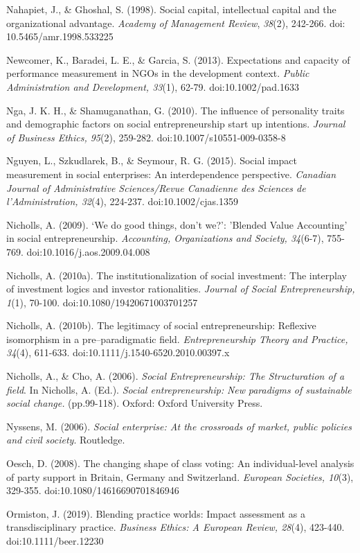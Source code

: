 \documentclass{article}
\begin{document}
Nahapiet, J., \& Ghoshal, S. (1998). Social capital, intellectual capital and the organizational advantage. \emph{Academy of Management Review}, \emph{38}(2), 242-266. doi: 10.5465/amr.1998.533225

Newcomer, K., Baradei, L. E., \& Garcia, S. (2013). Expectations and capacity of performance measurement in NGOs in the development context. \emph{Public Administration and Development, 33}(1), 62-79. doi:10.1002/pad.1633

Nga, J. K. H., \& Shamuganathan, G. (2010). The influence of personality traits and demographic factors on social entrepreneurship start up intentions. \emph{Journal of Business Ethics, 95}(2), 259-282. doi:10.1007/s10551-009-0358-8

Nguyen, L., Szkudlarek, B., \& Seymour, R. G. (2015). Social impact measurement in social enterprises: An interdependence perspective. \emph{Canadian Journal of Administrative Sciences/Revue Canadienne des Sciences de }\emph{l'Administration}\emph{, 32}(4), 224-237. doi:10.1002/cjas.1359

Nicholls, A. (2009). ‘We do good things, don't we?': 'Blended Value Accounting' in social entrepreneurship. \emph{Accounting, Organizations and Society, 34}(6-7), 755-769. doi:10.1016/j.aos.2009.04.008

Nicholls, A. (2010a). The institutionalization of social investment: The interplay of investment logics and investor rationalities. \emph{Journal of Social Entrepreneurship, 1}(1), 70-100. doi:10.1080/19420671003701257

Nicholls, A. (2010b). The legitimacy of social entrepreneurship: Reflexive isomorphism in a pre--paradigmatic field. \emph{Entrepreneurship Theory and Practice, 34}(4), 611-633. doi:10.1111/j.1540-6520.2010.00397.x

Nicholls, A., \& Cho, A. (2006). \emph{Social Entrepreneurship: The Structuration of a field}. In Nicholls, A. (Ed.). \emph{Social entrepreneurship: }\emph{New}\emph{ paradigms of sustainable social change.} (pp.99-118). Oxford: Oxford University Press.

Nyssens, M. (2006). \emph{Social enterprise: At the crossroads of market, public policies and} \emph{civil} \emph{society}. Routledge. 

Oesch, D. (2008). The changing shape of class voting: An individual-level analysis of party support in Britain, Germany and Switzerland. \emph{European Societies, 10}(3), 329-355. doi:10.1080/14616690701846946

Ormiston, J. (2019). Blending practice worlds: Impact assessment as a transdisciplinary practice. \emph{Business Ethics: A European Review, 28}(4), 423-440. doi:10.1111/beer.12230 
\end{document}

